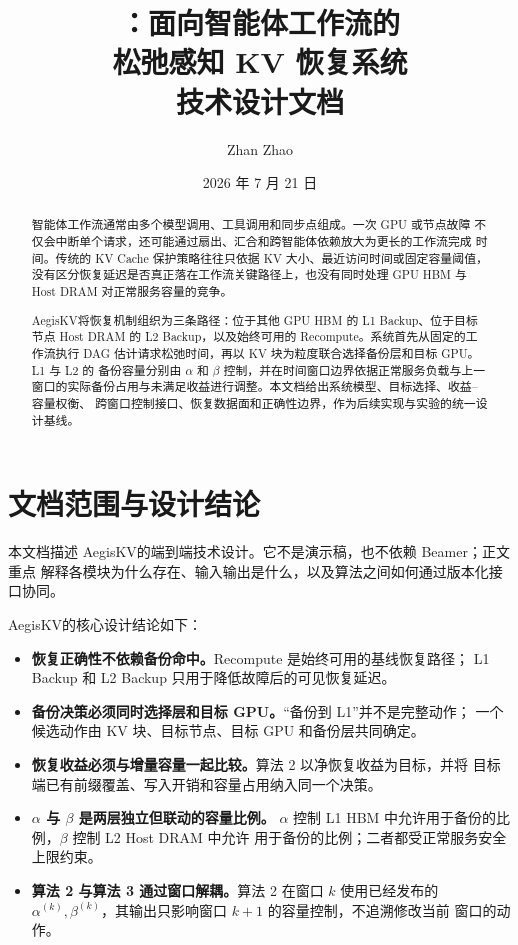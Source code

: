 \documentclass[UTF8,11pt,a4paper,fontset=fandol]{ctexart}
\title{\bfseries \AegisKV：面向智能体工作流的\\松弛感知 KV 恢复系统\\[0.45em]
  \large 技术设计文档}
\author{Zhan Zhao}
\date{2026 年 7 月 21 日}
\newcommand{\AegisKV}{AegisKV}
\begin{document}
\maketitle
\thispagestyle{empty}

\begin{abstract}
智能体工作流通常由多个模型调用、工具调用和同步点组成。一次 GPU 或节点故障
不仅会中断单个请求，还可能通过扇出、汇合和跨智能体依赖放大为更长的工作流完成
时间。传统的 KV Cache 保护策略往往只依据 KV 大小、最近访问时间或固定容量阈值，
没有区分恢复延迟是否真正落在工作流关键路径上，也没有同时处理 GPU HBM 与 Host
DRAM 对正常服务容量的竞争。

\AegisKV 将恢复机制组织为三条路径：位于其他 GPU HBM 的 L1 Backup、位于目标节点
Host DRAM 的 L2 Backup，以及始终可用的 Recompute。系统首先从固定的工作流执行
DAG 估计请求松弛时间，再以 KV 块为粒度联合选择备份层和目标 GPU。L1 与 L2 的
备份容量分别由 $\alpha$ 和 $\beta$ 控制，并在时间窗口边界依据正常服务负载与上一
窗口的实际备份占用与未满足收益进行调整。本文档给出系统模型、目标选择、收益--容量权衡、
跨窗口控制接口、恢复数据面和正确性边界，作为后续实现与实验的统一设计基线。
\end{abstract}

\clearpage
\tableofcontents
\clearpage

\section{文档范围与设计结论}

本文档描述 \AegisKV 的端到端技术设计。它不是演示稿，也不依赖 Beamer；正文重点
解释各模块为什么存在、输入输出是什么，以及算法之间如何通过版本化接口协同。

\AegisKV 的核心设计结论如下：

\begin{itemize}
  \item \textbf{恢复正确性不依赖备份命中。}Recompute 是始终可用的基线恢复路径；
    L1 Backup 和 L2 Backup 只用于降低故障后的可见恢复延迟。
  \item \textbf{备份决策必须同时选择层和目标 GPU。}“备份到 L1”并不是完整动作；
    一个候选动作由 KV 块、目标节点、目标 GPU 和备份层共同确定。
  \item \textbf{恢复收益必须与增量容量一起比较。}算法 2 以净恢复收益为目标，并将
    目标端已有前缀覆盖、写入开销和容量占用纳入同一个决策。
  \item \textbf{$\alpha$ 与 $\beta$ 是两层独立但联动的容量比例。}
    $\alpha$ 控制 L1 HBM 中允许用于备份的比例，$\beta$ 控制 L2 Host DRAM 中允许
    用于备份的比例；二者都受正常服务安全上限约束。
  \item \textbf{算法 2 与算法 3 通过窗口解耦。}算法 2 在窗口 $k$ 使用已经发布的
    $\alpha^{(k)},\beta^{(k)}$，其输出只影响窗口 $k+1$ 的容量控制，不追溯修改当前
    窗口的动作。
\end{itemize}
\end{document}
